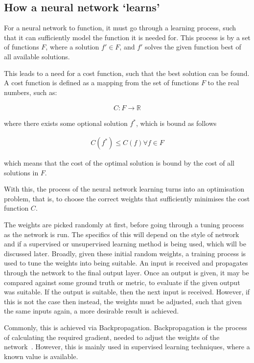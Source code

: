 \subsection{How a neural network `learns'}

For a neural network to function, it must go through a learning process, such
that it can sufficiently model the function it is needed for. This process is by
a set of functions $F$, where a solution $f' \in F$, and $f'$ solves the given
function best of all available solutions.

This leads to a need for a cost function, such that the best solution can be
found.  A cost function is defined as a mapping from the set of functions $F$ to
the real numbers, such as:

\begin{align}
    C : F \rightarrow \mathbb{R}
\end{align}

where there exists some optional solution $f^*$, which is bound as follows

\begin{align}
    C(f^*) \le C(f) \forall f \in F
\end{align}

which means that the cost of the optimal solution is bound by the cost of
all solutions in $F$.

With this, the process of the neural network learning turns into an optimisation
problem, that is, to choose the correct weights that sufficiently minimises the
cost function $C$.

The weights are picked randomly at first, before going through a tuning process
as the network is run. The specifics of this will depend on the style of network
and if a supervised or unsupervised learning method is being used, which will be
discussed later. Broadly, given these initial random weights, a training process
is used to tune the weights into being suitable. An input is received and
propagates through the network to the final output layer. Once an output is
given, it may be compared against some ground truth or metric, to evaluate if
the given output was suitable. If the output is suitable, then the next input
is received. However, if this is not the case then instead, the weights must be
adjusted, such that given the same inputs again, a more desirable result is
achieved.

Commonly, this is achieved via Backpropagation. Backpropagation is the process
of calculating the required gradient, needed to adjust the weights of the
network~\cite{goodfellow2016deep}. However, this is mainly used in supervised
learning techniques, where a known value is available.

